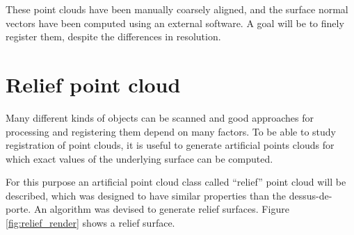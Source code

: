 These point clouds have been manually coarsely aligned, and the surface normal vectors have been computed using an external software. A goal will be to finely register them, despite the differences in resolution.


\section{Relief point cloud} \label{sec:relief}
Many different kinds of objects can be scanned and good approaches for processing and registering them depend on many factors. To be able to study registration of point clouds, it is useful to generate artificial points clouds for which exact values of the underlying surface can be computed.

For this purpose an artificial point cloud class called ``relief'' point cloud will be described, which was designed to have similar properties than the dessus-de-porte. An algorithm was devised to generate relief surfaces. Figure \ref{fig:relief_render} shows a relief surface.

